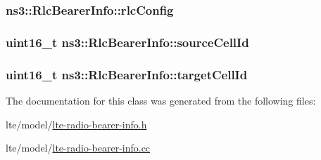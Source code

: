 \subsubsection[{\texorpdfstring{rlc\+Config}{rlcConfig}}]{ ns3\+::\+Rlc\+Bearer\+Info\+::rlc\+Config}\hypertarget{classns3_1_1RlcBearerInfo_a4847cf50401b318e8886955de63befc6}{}\label{classns3_1_1RlcBearerInfo_a4847cf50401b318e8886955de63befc6}
\subsubsection[{\texorpdfstring{source\+Cell\+Id}{sourceCellId}}]{\setlength{\rightskip}{0pt plus 5cm}uint16\+\_\+t ns3\+::\+Rlc\+Bearer\+Info\+::source\+Cell\+Id}\hypertarget{classns3_1_1RlcBearerInfo_a011fd56ec0eb36c5cf7bf36c571612b0}{}\label{classns3_1_1RlcBearerInfo_a011fd56ec0eb36c5cf7bf36c571612b0}
\subsubsection[{\texorpdfstring{target\+Cell\+Id}{targetCellId}}]{\setlength{\rightskip}{0pt plus 5cm}uint16\+\_\+t ns3\+::\+Rlc\+Bearer\+Info\+::target\+Cell\+Id}\hypertarget{classns3_1_1RlcBearerInfo_a9dfbbfd620995744d57e6d6425f0d85d}{}\label{classns3_1_1RlcBearerInfo_a9dfbbfd620995744d57e6d6425f0d85d}


The documentation for this class was generated from the following files\+:\begin{DoxyCompactItemize}
\item 
lte/model/\hyperlink{lte-radio-bearer-info_8h}{lte-\/radio-\/bearer-\/info.\+h}\item 
lte/model/\hyperlink{lte-radio-bearer-info_8cc}{lte-\/radio-\/bearer-\/info.\+cc}\end{DoxyCompactItemize}
